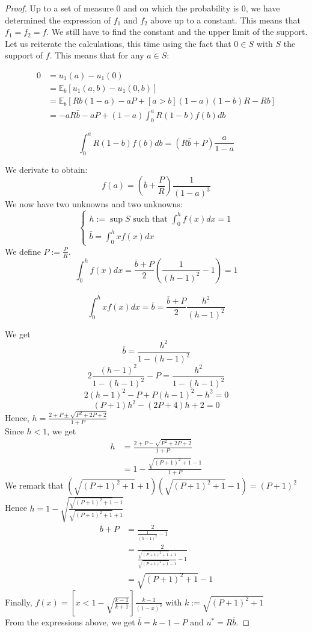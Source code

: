\documentclass[preprint,12pt,authoryear]{elsarticle}
\theoremstyle{definition}
\begin{document}
\begin{proof}
Up to a set of measure 0 and on which the probability is 0, we have determined the expression of $f_1$ and $f_2$ above up to a constant. This means that $f_1 = f_2 = f$.
We still have to find the constant and the upper limit of the support.
Let us reiterate the calculations, this time using the fact that $0 \in S$ with $S$ the support of $f$. This means that for any $a\in S$:

\begin{align*}0 &= u_1(a) - u_1(0)\\
&= \mathbb{E}_b[u_1(a, b) - u_1(0, b)]\\
&= \mathbb{E}_b\left[Rb(1-a) - aP  + [a>b](1-a)(1-b)R - Rb \right]\\
&= -a R \bar b - a P + (1-a) \int_0^a R (1-b) f(b) db\end{align*}

$$\int_0^a R (1-b) f(b) db = (R \bar b + P) \frac{a}{1-a}$$

We derivate to obtain:
$$f(a) = \left(\bar b + \frac{P}{R}\right) \frac{1}{(1-a)^3}$$
We now have two unknowns and two unknowns:
$$
\left\{ \begin{array}{ll}
h := \sup S  \text{ such that } \int_0^h f(x) dx = 1\\
\bar b = \int_0^h x f(x) dx
\end{array} \right.
$$
We define $P := \frac{P}{R}$.\\
$$\int_0^h f(x) dx = \frac{\bar b + P}{2} \left(\frac{1}{(h-1)^2}-1\right) = 1$$\\
$$\int_0^h x f(x) dx = \bar b = \frac{\bar b + P}{2} \frac{h^2}{(h-1)^2}$$

We get
$$\bar b = \frac{h^2}{1-(h-1)^2}$$
$$2 \frac{(h-1)^2}{1 - (h-1)^2} - P = \frac{h^2}{1 - (h-1)^2}$$
$$2(h-1)^2 - P + P(h-1)^2 - h^2 = 0$$
$$(P+ 1) h^2 - (2 P+ 4) h + 2 = 0$$
Hence, $h = \frac{2 + P\pm \sqrt{P^2 + 2 P+ 2}}{1 + P}$\\
Since $h<1$, we get
\begin{align*}
    h &= \frac{2 + P- \sqrt{P^2 + 2 P+ 2}}{1 + P}\\
      &= 1 - \frac{\sqrt{(P+ 1)^2 + 1} - 1}{1+P}
\end{align*}
We remark that $(\sqrt{(P+ 1)^2 + 1} + 1)( \sqrt{(P+ 1)^2 + 1} - 1) = (P+1)^2$\\
Hence $h = 1 - \sqrt{\frac{\sqrt{(P+ 1)^2 + 1} - 1}{\sqrt{(P+ 1)^2 + 1} + 1}}$
\begin{align*}\bar b + P&=\frac{2}{\frac{1}{(h-1)^2} - 1}\\
&= \frac{2}{\frac{\sqrt{(P+ 1)^2 + 1} + 1}{\sqrt{(P+ 1)^2 + 1} - 1} - 1}\\
&= \sqrt{(P+ 1)^2 + 1} - 1\end{align*}
Finally, $f(x) = \left[x < 1 - \sqrt{\frac{k - 1}{k + 1}}\right] \frac{ k - 1}{(1-x)^3}$ with $k := \sqrt{(P+ 1)^2 + 1}$\\
From the expressions above, we get $\bar b = k - 1 - P$ and $u^* = R \bar b$.
\end{proof}
\end{document}
